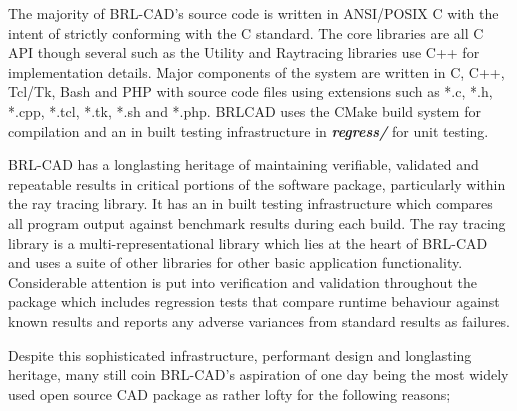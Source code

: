 \hspace{30} The   majority   of   BRL-­CAD's   source   code   is   written   in   ANSI/POSIX   C   with   the  
intent   of   strictly   conforming   with   the   C   standard.   The   core   libraries   are   all   C   API  
though   several   such   as   the   Utility   and   Ray­tracing   libraries   use   C++   for  
implementation   details.   Major   components   of   the   system   are   written   in   C,   C++,  
Tcl/Tk,   Bash   and   PHP   with   source   code   files   using   extensions   such   as   *.c,   *.h,  
*.cpp,   *.tcl,   *.tk,   *.sh   and   *.php.   BRL­CAD   uses   the   CMake   build   system   for  
compilation and an in built testing infrastructure in \textit{\textbf{regress/}} for unit testing.  

\hspace{30} BRL-­CAD   has   a   long­lasting   heritage   of   maintaining   verifiable,   validated  
and   repeatable   results   in   critical   portions   of   the   software   package,   particularly  
within   the   ray   tracing   library.   It   has   an   in built   testing   infrastructure   which  
compares   all   program   output   against   benchmark   results   during   each   build.   The  
ray   tracing   library   is   a   multi-­representational   library   which   lies   at   the   heart   of  
BRL­-CAD   and   uses   a   suite   of   other   libraries   for   other   basic   application  
functionality.   Considerable   attention   is   put   into   verification   and   validation  
throughout   the   package   which   includes   regression   tests   that   compare   runtime  
behaviour   against   known   results   and   reports   any   adverse   variances   from  
standard results as failures.  

\hspace{30} Despite   this   sophisticated   infrastructure,   performant   design   and  
long­lasting   heritage,   many   still   coin   BRL-­CAD's   aspiration   of   one   day   being   the  
most   widely   used   open   source   CAD   package   as   rather   lofty for the following reasons;

